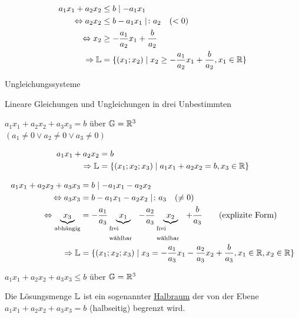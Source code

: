 \begin{enumerate}[A)]
	\clearpage
	\begin{align*}
	a_1x_1 + a_2x_2 &\le b \mid - a_1x_1\\
	\Leftrightarrow a_2x_2 &\le b - a_1x_1 \mid \colon a_2\quad(<0)\\
	\Leftrightarrow x_2 &\ge -\dfrac{a_1}{a_2}x_1 + \dfrac{b}{a_2}\\
	\Rightarrow \mathbb{L} &= \{(x_1;x_2)\mid x_2\ge -\dfrac{a_1}{a_2}x_1 + \dfrac{b}{a_2},x_1\in\mathbb{R}\}
	\end{align*}
	
	\Bem Ungleichungssysteme
	
	\clearpage
	{\bf\item Lineare Gleichungen und Ungleichungen in drei Unbestimmten}
	
	 $a_1x_1 + a_2x_2 + a_3x_3 = b$ über $\mathbb{G}=\mathbb{R}^3$\\
	$(a_1\ne0 \lor a_2\ne0 \lor a_3\ne0)$
	
	\begin{align*}
	a_1x_1 + a_2x_2 &= b\\
	\Rightarrow \mathbb{L} &= \{(x_1;x_2;x_3)\mid a_1x_1 + a_2x_2 = b,x_3\in\mathbb{R}\}
	\end{align*}
	
	\clearpage
	\begin{align*}
	a_1x_1 + a_2x_2 + a_3x_3 &= b \mid - a_1x_1 - a_2x_2\\
	\Leftrightarrow a_3x_3 &= b -a_1x_1 -a_2x_2 \mid \colon a_3\quad(\ne0)\\
	\Leftrightarrow \underbrace{x_3}_\text{abhängig} &= -\dfrac{a_1}{a_3}\underbrace{x_1}_\text{\parbox{1.2cm}{frei\\wählbar}} -\dfrac{a_2}{a_3}\underbrace{x_2}_\text{\parbox{1.2cm}{frei\\wählbar}} + \dfrac{b}{a_3} \qquad\text{(explizite Form)}\\
	\Rightarrow \L &= \{(x_1;x_2;x_3)\mid x_3= -\dfrac{a_1}{a_3}x_1 -\dfrac{a_2}{a_3}x_2 + \dfrac{b}{a_3},x_1\in\R,x_2\in\R\}
	\end{align*}
	
	 $a_1x_1 + a_2x_2 + a_3x_3 \le b$ über $\mathbb{G}=\mathbb{R}^3$
	
	Die Lösungsmenge $\mathbb{L}$ ist ein sogenannter \ul{Halbraum} der von der Ebene $a_1x_1 + a_2x_2 + a_3x_3 = b$ (halbseitig) begrenzt wird.
\end{enumerate}

